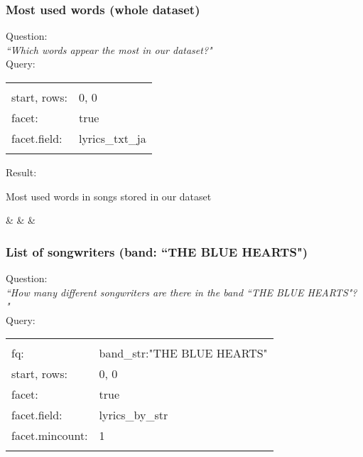 \bigskip



\subsubsection{Most used words (whole dataset)} \label{most-used-words-dataset}

Question: \\
\emph{``Which words appear the most in our dataset?"} \\

Query:

\begin{tabular}{| l | l |}
	\hline
	& \\
	start, rows: & 0, 0 \\
	facet: & true \\
	facet.field: & lyrics\_txt\_ja \\
	& \\
	\hline
\end{tabular}




\bigskip
Result: \\




\begin{myLongTable}{Most used words in songs stored in our dataset}
	
	& & & \\
\end{myLongTable}

\bigskip
\bigskip





\subsubsection{List of songwriters (band: ``THE BLUE HEARTS")}  \label{songwriters-TBH}

Question: \\
\emph{``How many different songwriters are there in the band ``THE BLUE HEARTS"? "} \\


Query:

\begin{tabular}{| l |  l |}
	\hline
	& \\
	fq: & band\_str:"THE BLUE HEARTS" \\
	start, rows: & 0, 0 \\
	facet: & true \\
	facet.field: & lyrics\_by\_str \\
	facet.mincount: & 1 \\
	& \\
	\hline
\end{tabular}


